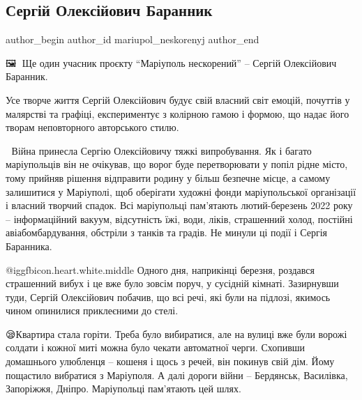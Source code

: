  
 
 
 
 

\subsection{Сергій Олексійович Баранник}
\label{sec:09_08_2023.fb.mariupol_neskorenyj.1.sergij_oleksijovych_barannyk}

\ifcmt
 author_begin
   author_id mariupol_neskorenyj
 author_end
\fi

🖼🎨 Ще один учасник проєкту \enquote{Маріуполь нескорений} – Сергій Олексійович Баранник.

Усе творче життя Сергій Олексійович будує свій власний світ емоцій, почуттів у
малярстві та графіці, експериментує з колірною гамою і формою, що надає його
творам неповторного авторського стилю.

📎 Війна принесла Сергію Олексійовичу тяжкі випробування. Як і багато
маріупольців він не очікував, що ворог буде перетворювати у попіл рідне місто,
тому прийняв рішення відправити родину у більш безпечне місце, а самому
залишитися у Маріуполі, щоб оберігати художні фонди маріупольської організації
і власний творчий спадок. Всі маріупольці пам'ятають лютий-березень 2022 року –
інформаційний вакуум, відсутність їжі, води, ліків, страшенний холод, постійні
авіабомбардування, обстріли з танків та градів. Не минули ці події і Сергія
Баранника.

@igg{fbicon.heart.white.middle} Одного дня, наприкінці березня, роздався
страшенний вибух і це вже було зовсім поруч, у сусідній кімнаті. Зазирнувши
туди, Сергій Олексійович побачив, що всі речі, які були на підлозі, якимось
чином опинилися приклеєними до стелі.

😪Квартира стала горіти. Треба було вибиратися, але на вулиці вже були ворожі
солдати і кожної миті можна було чекати автоматної черги. Схопивши домашнього
улюбленця – кошеня і щось з речей, він покинув свій дім. Йому пощастило
вибратися з Маріуполя. А далі дороги війни – Бердянськ, Василівка, Запоріжжя,
Дніпро. Маріупольці пам'ятають цей шлях.

